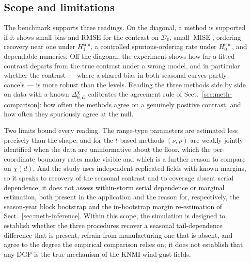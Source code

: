 \subsection{Scope and limitations}\label{sec:sim-interp}

The benchmark supports three readings. On the diagonal, a method is supported if it shows small bias and RMSE for the contrast on \(\mathcal D_0\), small \(\operatorname{MISE}\), ordering recovery near one under \(H_1^{\mathrm{sim}}\), a controlled spurious-ordering rate under \(H_0^{\mathrm{sim}}\), and dependable numerics. Off the diagonal, the experiment shows how far a fitted contrast departs from the true contrast under a wrong model, and in particular whether the contrast --- where a shared bias in both seasonal curves partly cancels --- is more robust than the levels. Reading the three methods side by side on data with a known \(\Delta_{0,D}^{\chi}\) calibrates the agreement rule of Sect.~\ref{sec:meth-comparison}: how often the methods agree on a genuinely positive contrast, and how often they spuriously agree at the null.

Two limits bound every reading. The range-type parameters are estimated less precisely than the shape, and for the \(t\)-based methods \((\nu,\rho)\) are weakly jointly identified when the data are uninformative about the floor, which the per-coordinate boundary rates make visible and which is a further reason to compare on \(\chi(d)\). And the study uses independent replicated fields with known margins, so it speaks to recovery of the seasonal contrast and to coverage absent serial dependence; it does not assess within-storm serial dependence or marginal estimation, both present in the application and the reason for, respectively, the season-year block bootstrap and the in-bootstrap margin re-estimation of Sect.~\ref{sec:meth-inference}. Within this scope, the simulation is designed to establish whether the three procedures recover a seasonal tail-dependence difference that is present, refrain from manufacturing one that is absent, and agree to the degree the empirical comparison relies on; it does not establish that any DGP is the true mechanism of the KNMI wind-gust fields.